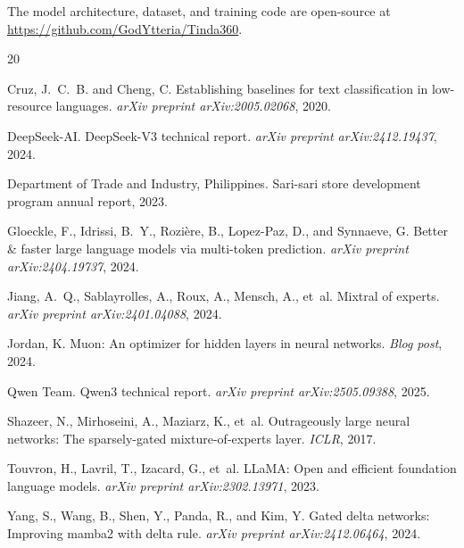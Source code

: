 \documentclass[11pt,a4paper]{article}
\begin{document}
The model architecture, dataset, and training code are open-source at
\url{https://github.com/GodYtteria/Tinda360}.

\begin{thebibliography}{20}

Cruz, J.~C.~B. and Cheng, C.
\newblock Establishing baselines for text classification in low-resource
  languages.
\newblock \emph{arXiv preprint arXiv:2005.02068}, 2020.

{DeepSeek-AI}.
\newblock DeepSeek-V3 technical report.
\newblock \emph{arXiv preprint arXiv:2412.19437}, 2024.

{Department of Trade and Industry, Philippines}.
\newblock Sari-sari store development program annual report, 2023.

Gloeckle, F., Idrissi, B.~Y., Rozière, B., Lopez-Paz, D., and Synnaeve, G.
\newblock Better \& faster large language models via multi-token prediction.
\newblock \emph{arXiv preprint arXiv:2404.19737}, 2024.

Jiang, A.~Q., Sablayrolles, A., Roux, A., Mensch, A., et~al.
\newblock Mixtral of experts.
\newblock \emph{arXiv preprint arXiv:2401.04088}, 2024.

Jordan, K.
\newblock Muon: An optimizer for hidden layers in neural networks.
\newblock \emph{Blog post}, 2024.

{Qwen Team}.
\newblock Qwen3 technical report.
\newblock \emph{arXiv preprint arXiv:2505.09388}, 2025.

Shazeer, N., Mirhoseini, A., Maziarz, K., et~al.
\newblock Outrageously large neural networks: The sparsely-gated
  mixture-of-experts layer.
\newblock \emph{ICLR}, 2017.

Touvron, H., Lavril, T., Izacard, G., et~al.
\newblock LLaMA: Open and efficient foundation language models.
\newblock \emph{arXiv preprint arXiv:2302.13971}, 2023.

Yang, S., Wang, B., Shen, Y., Panda, R., and Kim, Y.
\newblock Gated delta networks: Improving mamba2 with delta rule.
\newblock \emph{arXiv preprint arXiv:2412.06464}, 2024.

\end{thebibliography}
\end{document}
